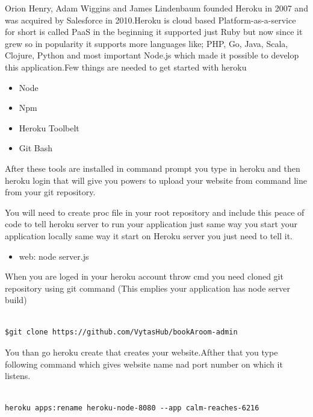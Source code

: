   Orion Henry, Adam Wiggins and James Lindenbaum founded Heroku in 2007 and was acquired by Salesforce in 2010.Heroku is cloud based Platform-as-a-service for short is called PaaS in the beginning it supported just Ruby but now since it grew so in popularity it supports more languages like; PHP, Go, Java, Scala, Clojure, Python and most important Node.js which made it possible to develop this application.Few things are needed to get started with heroku
\bigbreak
\begin{itemize}

	\item Node 
	\item Npm
	\item Heroku Toolbelt
	\item Git Bash
	
\end{itemize}
\bigbreak

After these tools are installed in command prompt you type in heroku and then heroku login that will give you powers to upload your website from command line from your git repository.

You will need to create proc file in your root repository and include this peace of code to tell heroku server to run your application just same way you start your application locally same way it start on Heroku server you just need to tell it.

\bigbreak


\begin{itemize}
	
	\item web: node server.js

\end{itemize}
\bigbreak

When you are loged in your heroku account throw cmd you need cloned git repository using git command (This emplies your application has node server build)
\bigbreak

\begin{verbatim}

$git clone https://github.com/VytasHub/bookAroom-admin

\end{verbatim}
\bigbreak

You than go heroku create that creates your website.Afther that you type following command which gives website name nad port number on which it listens. 

\bigbreak
\begin{verbatim}

heroku apps:rename heroku-node-8080 --app calm-reaches-6216

\end{verbatim}
\bigbreak

